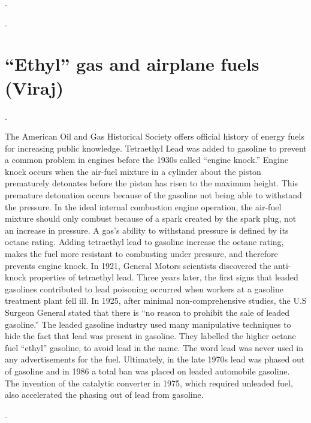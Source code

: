 \documentclass{article}
\begin{document}
. 

\medskip

.

\medskip

\section{``Ethyl'' gas and airplane fuels (Viraj)}

\noindent {} .

The American Oil and Gas Historical Society offers official history of energy fuels for increasing public knowledge. Tetraethyl Lead was added to gasoline to prevent a common problem in engines before the 1930s called “engine knock.” Engine knock occurs when the air-fuel mixture in a cylinder about the piston prematurely detonates before the piston has risen to the maximum height. This premature detonation occurs because of the gasoline not being able to withstand the pressure. In the ideal internal combustion engine operation, the air-fuel mixture should only combust because of a spark created by the spark plug, not an increase in pressure. A gas’s ability to withstand pressure is defined by its octane rating. Adding tetraethyl lead to gasoline increase the octane rating, makes the fuel more resistant to combusting under pressure, and therefore prevents engine knock. In 1921, General Motors scientists discovered the anti-knock properties of tetraethyl lead. Three years later, the first signs that leaded gasolines contributed to lead poisoning occurred when workers at a gasoline treatment plant fell ill. In 1925, after minimal non-comprehensive studies, the U.S Surgeon General stated that there is “no reason to prohibit the sale of leaded gasoline.” The leaded gasoline industry used many manipulative techniques to hide the fact that lead was present in gasoline. They labelled the higher octane fuel “ethyl” gasoline, to avoid lead in the name. The word lead was never used in any advertisements for the fuel. Ultimately, in the late 1970s lead was phased out of gasoline and in 1986 a total ban was placed on leaded automobile gasoline. The invention of the catalytic converter in 1975, which required unleaded fuel, also accelerated the phasing out of lead from gasoline. 

\bigskip


\noindent {} .
\end{document}
